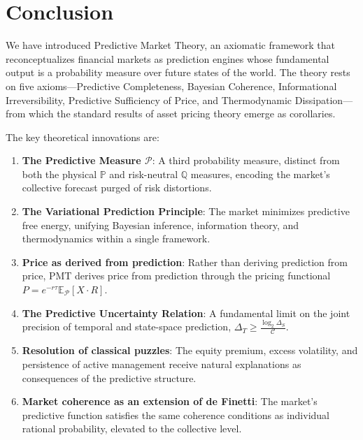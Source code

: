 \documentclass[12pt,a4paper]{article}
\theoremstyle{definition}
\newcommand{\E}{\mathbb{E}}
\newcommand{\Prob}{\mathbb{P}}
\newcommand{\Q}{\mathbb{Q}}
\newcommand{\PP}{\mathcal{P}}
\begin{document}

\section{Conclusion}\label{sec:conclusion}

We have introduced Predictive Market Theory, an axiomatic framework that reconceptualizes financial markets as prediction engines whose fundamental output is a probability measure over future states of the world. The theory rests on five axioms---Predictive Completeness, Bayesian Coherence, Informational Irreversibility, Predictive Sufficiency of Price, and Thermodynamic Dissipation---from which the standard results of asset pricing theory emerge as corollaries.

The key theoretical innovations are:

\begin{enumerate}[label=(\roman*)]
    \item \textbf{The Predictive Measure $\PP$}: A third probability measure, distinct from both the physical $\Prob$ and risk-neutral $\Q$ measures, encoding the market's collective forecast purged of risk distortions.
    
    \item \textbf{The Variational Prediction Principle}: The market minimizes predictive free energy, unifying Bayesian inference, information theory, and thermodynamics within a single framework.
    
    \item \textbf{Price as derived from prediction}: Rather than deriving prediction from price, PMT derives price from prediction through the pricing functional $P = e^{-r\tau}\E_\PP[X \cdot R]$.
    
    \item \textbf{The Predictive Uncertainty Relation}: A fundamental limit on the joint precision of temporal and state-space prediction, $\Delta_T \geq \frac{\log_2 \Delta_S}{\mathcal{C}}$.
    
    \item \textbf{Resolution of classical puzzles}: The equity premium, excess volatility, and persistence of active management receive natural explanations as consequences of the predictive structure.
    
    \item \textbf{Market coherence as an extension of de Finetti}: The market's predictive function satisfies the same coherence conditions as individual rational probability, elevated to the collective level.
\end{enumerate}
\end{document}

